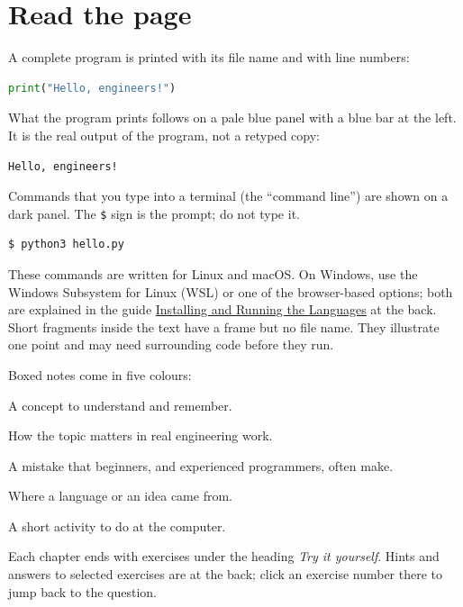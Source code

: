 \section*{Read the page}
A complete program is printed with its file name and with line numbers:
\begin{lstlisting}[language=Python,style=numbered,title={\footnotesize\sffamily\bfseries\color{accent}\texttt{python/hello.py}\normalfont\sffamily\color{muted}\enspace a first script}]
print("Hello, engineers!")
\end{lstlisting}
What the program prints follows on a pale blue panel with a blue bar at the left. It is
the real output of the program, not a retyped copy:
\begin{lstlisting}[style=output,title={\footnotesize\sffamily\color{muted}Output}]
Hello, engineers!
\end{lstlisting}
Commands that you type into a terminal (the ``command line'') are shown on a dark panel.
The \texttt{\$} sign is the prompt; do not type it.
\begin{lstlisting}[style=shell]
$ python3 hello.py
\end{lstlisting}
These commands are written for Linux and macOS. On Windows, use the Windows Subsystem for
Linux (WSL) or one of the browser-based options; both are explained in the guide
\hyperref[app:install]{Installing and Running the Languages} at the back.
Short fragments inside the text have a frame but no file name. They illustrate one point
and may need surrounding code before they run.

Boxed notes come in five colours:
\begin{keyidea}
A concept to understand and remember.
\end{keyidea}
\begin{engnote}
How the topic matters in real engineering work.
\end{engnote}
\begin{pitfall}
A mistake that beginners, and experienced programmers, often make.
\end{pitfall}
\begin{history}
Where a language or an idea came from.
\end{history}
\begin{tryit}
A short activity to do at the computer.
\end{tryit}
Each chapter ends with exercises under the heading \emph{Try it yourself}. Hints and
answers to selected exercises are at the back; click an exercise number there to jump
back to the question.

